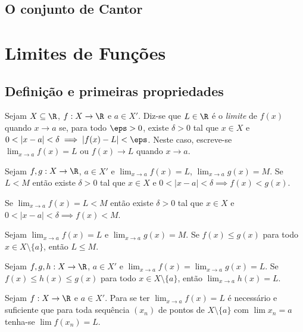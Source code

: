 \documentclass{article}
\begin{document}
\subsection{O conjunto de Cantor}

\section{Limites de Funções}
\subsection{Definição e primeiras propriedades}

\begin{defn}
    Sejam \(X \subseteq \R\), \(f: X \to \R\) e \(a \in X'\). Diz-se que \(L \in \R\) é o \emph{limite} de \(f(x)\) quando \(x \to a\) se, para todo \(\eps > 0\), existe \(\delta > 0\) tal que \(x \in X\) e \(0 < |x - a| < \delta \implies |f(x) - L| < \eps\). Neste caso, escreve-se \(\lim_{x \to a} f(x) = L\) ou \(f(x) \to L\) quando \(x \to a\).
\end{defn}

\begin{prop}
    Sejam \(f, g: X \to \R\), \(a \in X'\) e \(\lim_{x \to a} f(x) = L\), \(\lim_{x \to a} g(x) = M\). Se \(L < M\) então existe \(\delta > 0\) tal que \(x \in X\) e \(0 < |x - a| < \delta \implies f(x) < g(x)\).
\end{prop}

\begin{cor}
    Se \(\lim_{x \to a} f(x) = L < M\) então existe \(\delta > 0\) tal que \(x \in X\) e \(0 < |x - a| < \delta \implies f(x) < M\).
\end{cor}

\begin{cor}
    Sejam \(\lim_{x \to a} f(x) = L\) e \(\lim_{x \to a} g(x) = M\). Se \(f(x) \leq g(x)\) para todo \(x \in X \setminus \{a\}\), então \(L \leq M\).
\end{cor}

\begin{thm} 
    Sejam \(f, g, h: X \to \R\), \(a \in X'\) e \(\lim_{x \to a} f(x) = \lim_{x \to a} g(x) = L\). Se \(f(x) \leq h(x) \leq g(x)\) para todo \(x \in X \setminus \{a\}\), então \(\lim_{x \to a} h(x) = L\).
\end{thm}

\begin{prop}
    Sejam \(f: X \to \R\) e \(a \in X'\). Para se ter \(\lim_{x \to a} f(x) = L\) é necessário e suficiente que para toda sequência \((x_n)\) de pontos de \(X \setminus \{a\}\) com \(\lim x_n = a\) tenha-se \(\lim f(x_n) = L\).
\end{prop}
\end{document}
